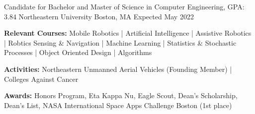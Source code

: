 
\begin{cventries}
  \cventry
    {Candidate for Bachelor and Master of Science in Computer Engineering, GPA: 3.84} %
    {Northeastern University} %
    {Boston, MA} %
    {Expected May 2022} %
    {
      \begin{cvitems} %
         \item {\textbf{Relevant Courses:} Mobile Robotics | Artificial Intelligence | Assistive Robotics | Robtics Sensing \& Navigation | Machine Learning | Statistics \& Stochastic Processes | Object Oriented Design | Algorithms}
         \item {\textbf{Activities:} Northeastern Unmanned Aerial Vehicles (Founding Member) | Colleges Against Cancer}
         \item {\textbf{Awards:} Honors Program, Eta Kappa Nu, Eagle Scout, Dean's Scholarship, Dean's List, NASA International Space Apps Challenge Boston (1st place)}
      \end{cvitems}
    }
\end{cventries}
